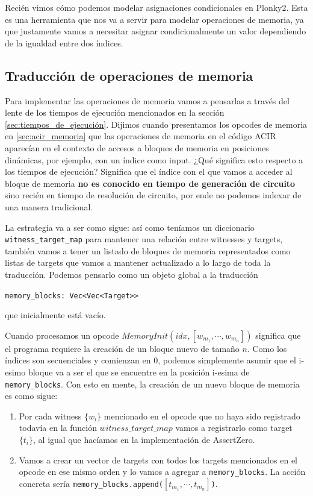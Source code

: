 Recién vimos cómo podemos modelar asignaciones condicionales en Plonky2. Esta es una herramienta que nos va a servir para modelar operaciones de memoria, ya que justamente vamos a necesitar asignar condicionalmente un valor dependiendo de la igualdad entre dos índices.


\subsection{Traducción de operaciones de memoria}
Para implementar las operaciones de memoria vamos a pensarlas a través del lente de los tiempos de ejecución mencionados en la sección \ref{sec:tiempos_de_ejecución}. Dijimos cuando presentamos los opcodes de memoria en \ref{sec:acir_memoria} que las operaciones de memoria en el código ACIR aparecían en el contexto de accesos a bloques de memoria en posiciones dinámicas, por ejemplo, con un índice como input. ¿Qué significa esto respecto a los tiempos de ejecución? Significa que el índice con el que vamos a acceder al bloque de memoria \textbf{no es conocido en tiempo de generación de circuito} sino recién en tiempo de resolución de circuito, por ende no podemos indexar de una manera tradicional.

La estrategia va a ser como sigue: así como teníamos un diccionario \texttt{witness\_target\_map} para mantener una relación entre witnesses y targets, también vamos a tener un listado de bloques de memoria representados como listas de targets que vamos a mantener actualizado a lo largo de toda la traducción. Podemos pensarlo como un objeto global a la traducción 

\vspace{0.5em}
\verb|memory_blocks: Vec<Vec<Target>>| 
\vspace{0.5em}

\noindent que inicialmente está vacío.

Cuando procesamos un opcode $MemoryInit(idx, [w_{m_1}, \cdots, w_{m_n}])$ significa que el programa requiere la creación de un bloque nuevo de tamaño $n$. Como los índices son secuenciales y comienzan en $0$, podemos simplemente asumir que el i-esimo bloque va a ser el que se encuentre en la posición i-esima de \texttt{memory\_blocks}. Con esto en mente, la creación de un nuevo bloque de memoria es como sigue:
\begin{enumerate}
    \item Por cada witness $\{w_i\}$ mencionado en el opcode que no haya sido registrado todavía en la función $witness\_target\_map$ vamos a registrarlo como target $\{t_i\}$, al igual que hacíamos en la implementación de AssertZero. 

    \item Vamos a crear un vector de targets con todos los targets mencionados en el opcode en ese mismo orden y lo vamos a agregar a \texttt{memory\_blocks}. La acción concreta sería \texttt{memory\_blocks.append(\ensuremath{[t_{m_1}, \cdots, t_{m_n}]})}.
    
\end{enumerate}


